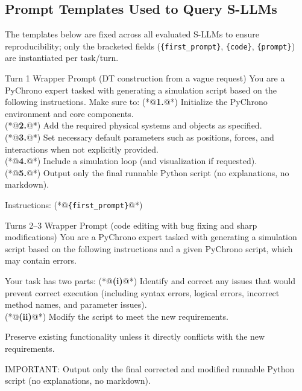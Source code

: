 \documentclass{ieeeaccess}
\begin{document}
\begin{appendices}
    \section{Prompt Templates Used to Query S-LLMs}
\label{app:prompt_templates}

\noindent The templates below are fixed across all evaluated S-LLMs to ensure reproducibility; only the bracketed fields (\texttt{\{first\_prompt\}}, \texttt{\{code\}}, \texttt{\{prompt\}}) are instantiated per task/turn.

\begin{PromptBlock}{Turn 1 Wrapper Prompt (DT construction from a vague request)}
You are a PyChrono expert tasked with generating a simulation script based on the following instructions. Make sure to:
(*@\textbf{1.}@*) Initialize the PyChrono environment and core components.\\
(*@\textbf{2.}@*) Add the required physical systems and objects as specified.\\
(*@\textbf{3.}@*) Set necessary default parameters such as positions, forces, and interactions when not explicitly provided.\\
(*@\textbf{4.}@*) Include a simulation loop (and visualization if requested).\\
(*@\textbf{5.}@*) Output only the final runnable Python script (no explanations, no markdown).

Instructions:
(*@\texttt{\{first\_prompt\}}@*)
\end{PromptBlock}

\begin{PromptBlock}{Turns 2--3 Wrapper Prompt (code editing with bug fixing and sharp modifications)}
You are a PyChrono expert tasked with generating a simulation script based on the following instructions and a given PyChrono script, which may contain errors.

Your task has two parts:
(*@\textbf{(i)}@*) Identify and correct any issues that would prevent correct execution (including syntax errors, logical errors, incorrect method names, and parameter issues).\\
(*@\textbf{(ii)}@*) Modify the script to meet the new requirements.

Preserve existing functionality unless it directly conflicts with the new requirements.

IMPORTANT: Output only the final corrected and modified runnable Python script (no explanations, no markdown).


\end{PromptBlock}
\end{appendices}
\end{document}

